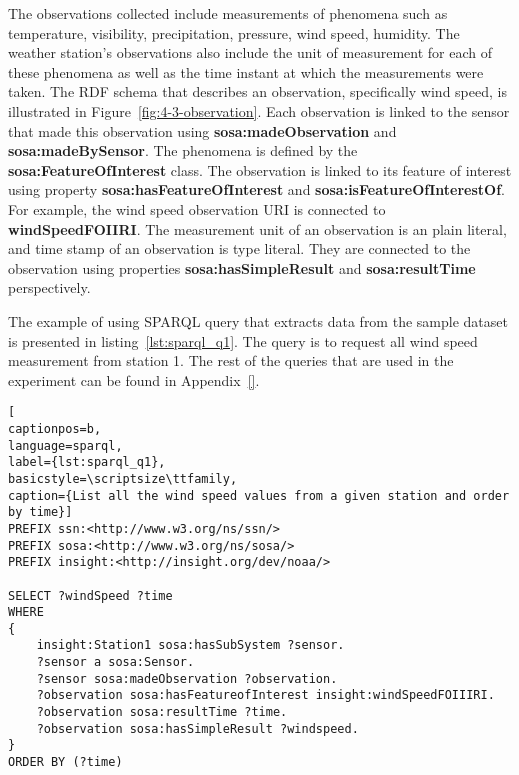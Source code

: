 The observations collected include measurements of phenomena such as temperature, visibility, precipitation, pressure, wind speed, humidity. 
The weather station’s observations also include the unit of measurement for each of these phenomena as well as the time instant at which the measurements were taken. 
The RDF schema that describes an observation, specifically wind speed, is illustrated in Figure~\ref{fig:4-3-observation}.
Each observation is linked to the sensor that made this observation using \textbf{sosa:madeObservation} and \textbf{sosa:madeBySensor}.
The phenomena is defined by the \textbf{sosa:FeatureOfInterest} class.
The observation is linked to its feature of interest using property \textbf{sosa:hasFeatureOfInterest} and \textbf{sosa:isFeatureOfInterestOf}. 
For example, the wind speed observation URI is connected to \textbf{windSpeedFOIIRI}.
The measurement unit of an observation is an plain literal, and time stamp of an observation is type literal.
They are connected to the observation using properties \textbf{sosa:hasSimpleResult} and \textbf{sosa:resultTime} perspectively.



The example of using SPARQL query that extracts data from the sample dataset is presented in listing~\ref{lst:sparql_q1}.
The query is to request all wind speed measurement from station 1. 
The rest of the queries that are used in the experiment can be found in Appendix~\ref{}.

\begin{lstlisting}[
captionpos=b, 
language=sparql,
label={lst:sparql_q1},
basicstyle=\scriptsize\ttfamily,
caption={List all the wind speed values from a given station and order by time}]
PREFIX ssn:<http://www.w3.org/ns/ssn/>
PREFIX sosa:<http://www.w3.org/ns/sosa/>
PREFIX insight:<http://insight.org/dev/noaa/>

SELECT ?windSpeed ?time
WHERE
{
    insight:Station1 sosa:hasSubSystem ?sensor.
    ?sensor a sosa:Sensor.
    ?sensor sosa:madeObservation ?observation.
    ?observation sosa:hasFeatureofInterest insight:windSpeedFOIIIRI.
    ?observation sosa:resultTime ?time.
    ?observation sosa:hasSimpleResult ?windspeed.
}
ORDER BY (?time)
\end{lstlisting}



